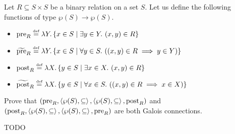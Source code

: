 \begin{exercise}{
    Let $R \subseteq S \times S$ be a binary relation on a set $S$. Let us define the following functions of type $\wp(S) \to \wp(S)$.
    \begin{itemize}
        \item $\operatorname{pre}_R \overset{\text{\tiny def}}{=} \lambda Y. \left\{ x \in S \mid \exists y \in Y.\ (x, y) \in R \right\}$
        \item $\widetilde{\operatorname{pre}}_R \overset{\text{\tiny def}}{=} \lambda Y. \left\{ x \in S \mid \forall y \in S.\ ((x, y) \in R \implies y \in Y)\right\}$
        \item $\operatorname{post}_R \overset{\text{\tiny def}}{=} \lambda X. \left\{ y \in S \mid \exists x \in X.\ (x, y) \in R \right\}$
        \item $\widetilde{\operatorname{post}}_R \overset{\text{\tiny def}}{=} \lambda X. \left\{ y \in S \mid \forall x \in S.\ ((x, y) \in R \implies x \in X)\right\}$
    \end{itemize}
    Prove that $(\operatorname{pre}_R, \left<\wp(S), \subseteq\right>, \left<\wp(S), \subseteq\right>, \operatorname{post}_R)$ and $(\operatorname{post}_R, \left<\wp(S), \subseteq\right>, \left<\wp(S), \subseteq\right>, \operatorname{pre}_R)$ are both Galois connections.
}
    TODO
\end{exercise}
